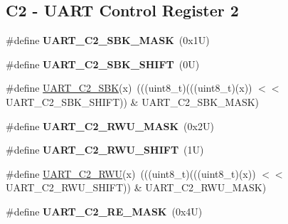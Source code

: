 \subsection*{C2 -\/ U\+A\+RT Control Register 2}
\begin{DoxyCompactItemize}
\item 
\mbox{\label{group___u_a_r_t___register___masks_ga8d243e5b3a3ece12bdeca818bacb15ee}} 
\#define {\bfseries U\+A\+R\+T\+\_\+\+C2\+\_\+\+S\+B\+K\+\_\+\+M\+A\+SK}~(0x1\+U)
\item 
\mbox{\label{group___u_a_r_t___register___masks_ga94f62ff8a45a08ae54b40da725fb245b}} 
\#define {\bfseries U\+A\+R\+T\+\_\+\+C2\+\_\+\+S\+B\+K\+\_\+\+S\+H\+I\+FT}~(0\+U)
\item 
\#define \mbox{\hyperlink{group___u_a_r_t___register___masks_ga5d861d856f5540b2349706263333089b}{U\+A\+R\+T\+\_\+\+C2\+\_\+\+S\+BK}}(x)~(((uint8\+\_\+t)(((uint8\+\_\+t)(x)) $<$$<$ U\+A\+R\+T\+\_\+\+C2\+\_\+\+S\+B\+K\+\_\+\+S\+H\+I\+FT)) \& U\+A\+R\+T\+\_\+\+C2\+\_\+\+S\+B\+K\+\_\+\+M\+A\+SK)
\item 
\mbox{\label{group___u_a_r_t___register___masks_ga279868a42acca3c1eeba8c53bb94b208}} 
\#define {\bfseries U\+A\+R\+T\+\_\+\+C2\+\_\+\+R\+W\+U\+\_\+\+M\+A\+SK}~(0x2\+U)
\item 
\mbox{\label{group___u_a_r_t___register___masks_gaa163993d547a96c2ea002ff52e6b0971}} 
\#define {\bfseries U\+A\+R\+T\+\_\+\+C2\+\_\+\+R\+W\+U\+\_\+\+S\+H\+I\+FT}~(1\+U)
\item 
\#define \mbox{\hyperlink{group___u_a_r_t___register___masks_gadbfac0194fbb2ff77f387fc784c43db9}{U\+A\+R\+T\+\_\+\+C2\+\_\+\+R\+WU}}(x)~(((uint8\+\_\+t)(((uint8\+\_\+t)(x)) $<$$<$ U\+A\+R\+T\+\_\+\+C2\+\_\+\+R\+W\+U\+\_\+\+S\+H\+I\+FT)) \& U\+A\+R\+T\+\_\+\+C2\+\_\+\+R\+W\+U\+\_\+\+M\+A\+SK)
\item 
\mbox{\label{group___u_a_r_t___register___masks_ga181a8e8fd0f780d45f1bff7c76836fe5}} 
\#define {\bfseries U\+A\+R\+T\+\_\+\+C2\+\_\+\+R\+E\+\_\+\+M\+A\+SK}~(0x4\+U)
\item 
\mbox{\label{group___u_a_r_t___register___masks_ga65bf907ff7aaa0afeb5a3c34ff3a4b2c}} 

\end{DoxyCompactItemize}

